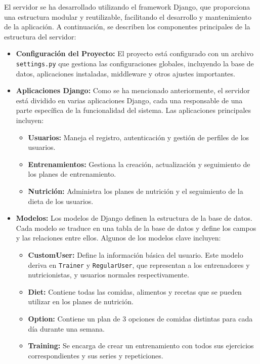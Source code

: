 El servidor se ha desarrollado utilizando el framework Django, que proporciona una estructura modular y reutilizable, facilitando el desarrollo y mantenimiento de la aplicación. A continuación, se describen los componentes principales de la estructura del servidor:

\begin{itemize}
    \item \textbf{Configuración del Proyecto:} El proyecto está configurado con un archivo \texttt{settings.py} que gestiona las configuraciones globales, incluyendo la base de datos, aplicaciones instaladas, middleware y otros ajustes importantes.
    
    \item \textbf{Aplicaciones Django:} Como se ha mencionado anteriormente, el servidor está dividido en varias aplicaciones Django, cada una responsable de una parte específica de la funcionalidad del sistema. Las aplicaciones principales incluyen:
    \begin{itemize}
        \item \textbf{Usuarios:} Maneja el registro, autenticación y gestión de perfiles de los usuarios.
        \item \textbf{Entrenamientos:} Gestiona la creación, actualización y seguimiento de los planes de entrenamiento.
        \item \textbf{Nutrición:} Administra los planes de nutrición y el seguimiento de la dieta de los usuarios.
    \end{itemize}
    
    \item \textbf{Modelos:} Los modelos de Django definen la estructura de la base de datos. Cada modelo se traduce en una tabla de la base de datos y define los campos y las relaciones entre ellos. Algunos de los modelos clave incluyen:
    \begin{itemize}
        \item \textbf{CustomUser:} Define la información básica del usuario. Este modelo deriva en \texttt{Trainer} y \texttt{RegularUser}, que representan a los entrenadores y nutricionistas, y usuarios normales respectivamente.
        \item \textbf{Diet:} Contiene todas las comidas, alimentos y recetas que se pueden utilizar en los planes de nutrición.
        \item \textbf{Option:} Contiene un plan de 3 opciones de comidas distintas para cada día durante una semana.
        \item \textbf{Training:} Se encarga de crear un entrenamiento con todos sus ejercicios correspondientes y sus series y repeticiones.
    \end{itemize}
    

\end{itemize}
